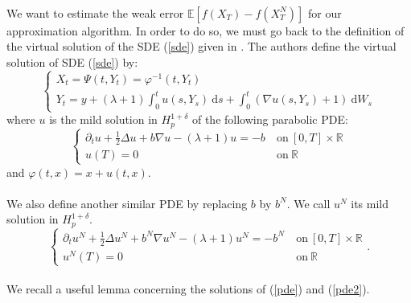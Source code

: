 \documentclass{article}[12pt]
\newcommand{\R}{\mathbb{R}}
\newcommand{\E}{\mathbb{E}}
\newcommand{\di}{\mathrm{d}}
\begin{document}
        \paragraph{}
        We want to estimate the weak error $\E[f(X_T)-f(X_T^N)]$ for our approximation algorithm. In order to do so, we must go back to the definition of the virtual solution of the SDE (\ref{sde}) given in \cite{Fla-Iss-Rus-2017}. The authors define the virtual solution of SDE (\ref{sde}) by:
        \begin{equation}
        \begin{cases}
        X_t = \Psi(t,Y_t) = \varphi^{-1}(t,Y_t)
        \\
        Y_t = y + (\lambda+1)\int_0^t u(s,Y_s)\ \di s +\int_0^t (\nabla u(s,Y_s)+1)\ \di W_s
        \end{cases}
        \end{equation}
        where $u$ is the mild solution in $H_p^{1+\delta}$ of the following parabolic PDE:
        \begin{equation}\label{pde}
        \begin{cases}
        \partial_t u + \frac{1}{2}\Delta u + b\nabla u - (\lambda+1)u = -b\ &\mathrm{on}\ [0,T]\times\R\\
        u(T) = 0\ &\mathrm{on}\ \R
        \end{cases}
        \end{equation}
        and $\varphi(t,x) = x + u(t,x)$.
        
        \paragraph{}
        We also define another similar PDE by replacing $b$ by $b^N$. We call $u^N$ its mild solution in $H_p^{1+\delta}$.
        \begin{equation}\label{pde2}
        \begin{cases}
        \partial_t u^N + \frac{1}{2}\Delta u^N + b^N\nabla u^N - (\lambda+1)u^N = -b^N\ &\mathrm{on}\ [0,T]\times\R\\
        u^N(T) = 0\ &\mathrm{on}\ \R
        \end{cases}.
        \end{equation}
        
        \paragraph{}              
        We recall a useful lemma concerning the solutions of (\ref{pde}) and (\ref{pde2}).
        
\end{document}
